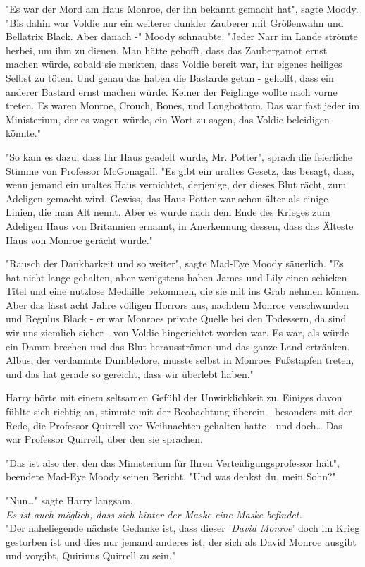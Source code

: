 {"Es war der Mord am Haus Monroe, der ihn bekannt gemacht hat", sagte Moody. "Bis dahin war Voldie nur ein weiterer dunkler Zauberer mit Größenwahn und Bellatrix Black. Aber danach -" Moody schnaubte. "Jeder Narr im Lande strömte herbei, um ihm zu dienen. Man hätte gehofft, dass das Zaubergamot ernst machen würde, sobald sie merkten, dass Voldie bereit war, ihr eigenes heiliges Selbst zu töten. Und genau das haben die Bastarde getan - gehofft, dass ein anderer Bastard ernst machen würde. Keiner der Feiglinge wollte nach vorne treten. Es waren Monroe, Crouch, Bones, und Longbottom. Das war fast jeder im Ministerium, der es wagen würde, ein Wort zu sagen, das Voldie beleidigen könnte."

"So kam es dazu, dass Ihr Haus geadelt wurde, Mr. Potter", sprach die feierliche Stimme von Professor McGonagall. "Es gibt ein uraltes Gesetz, das besagt, dass, wenn jemand ein uraltes Haus vernichtet, derjenige, der dieses Blut rächt, zum Adeligen gemacht wird. Gewiss, das Haus Potter war schon älter als einige Linien, die man Alt nennt. Aber es wurde nach dem Ende des Krieges zum Adeligen Haus von Britannien ernannt, in Anerkennung dessen, dass das Älteste Haus von Monroe gerächt wurde."

"Rausch der Dankbarkeit und so weiter", sagte Mad-Eye Moody säuerlich. "Es hat nicht lange gehalten, aber wenigstens haben James und Lily einen schicken Titel und eine nutzlose Medaille bekommen, die sie mit ins Grab nehmen können. Aber das lässt acht Jahre völligen Horrors aus, nachdem Monroe verschwunden und Regulus Black - er war Monroes private Quelle bei den Todessern, da sind wir uns ziemlich sicher - von Voldie hingerichtet worden war. Es war, als würde ein Damm brechen und das Blut herausströmen und das ganze Land ertränken. Albus, der verdammte Dumbledore, musste selbst in Monroes Fußstapfen treten, und das hat gerade so gereicht, dass wir überlebt haben."

Harry hörte mit einem seltsamen Gefühl der Unwirklichkeit zu. Einiges davon fühlte sich richtig an, stimmte mit der Beobachtung überein - besonders mit der Rede, die Professor Quirrell vor Weihnachten gehalten hatte - und doch… Das war Professor Quirrell, über den sie sprachen.

"Das ist also der, den das Ministerium für Ihren Verteidigungsprofessor hält", beendete Mad-Eye Moody seinen Bericht. "Und was denkst du, mein Sohn?"

"Nun…" sagte Harry langsam.\\ \emph{Es ist auch möglich, dass sich hinter der Maske eine Maske befindet.}\\ "Der naheliegende nächste Gedanke ist, dass dieser '\emph{David Monroe}' doch im Krieg gestorben ist und dies nur jemand anderes ist, der sich als David Monroe ausgibt und vorgibt, Quirinus Quirrell zu sein."

}
